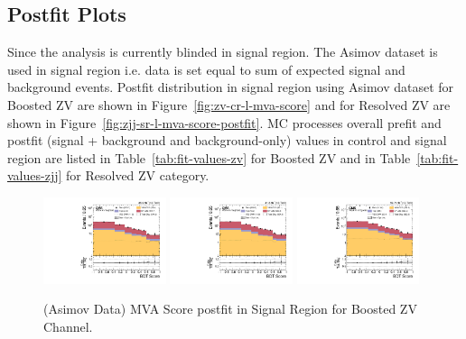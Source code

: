 \clearpage
\subsection{
  Postfit Plots
}

Since the analysis is currently blinded in signal region. The Asimov
dataset is used in signal region i.e.
data is set equal to sum of expected signal and background events.
Postfit distribution in signal region using Asimov dataset
for Boosted ZV are shown in Figure~\ref{fig:zv-cr-l-mva-score}
and for Resolved ZV are shown in Figure~\ref{fig:zjj-sr-l-mva-score-postfit}.
\gls{MC} processes overall prefit and postfit (signal + background and background-only)
values in control and signal region are listed in Table~\ref{tab:fit-values-zv}
for Boosted ZV and in Table~\ref{tab:fit-values-zjj} for Resolved ZV category.

\begin{figure}[!ht]
  \centering
  \includegraphics[width=0.32\textwidth]{analysis_plots/2016_zv.sr_l_postfit/sr_l_postfit/mva_score_zv_var2_log.pdf}
  \includegraphics[width=0.32\textwidth]{analysis_plots/2017_zv.sr_l_postfit/sr_l_postfit/mva_score_zv_var2_log.pdf}
  \includegraphics[width=0.32\textwidth]{analysis_plots/2018_zv.sr_l_postfit/sr_l_postfit/mva_score_zv_var2_log.pdf} \\
  \caption[MVA Score postfit in Signal Region for Boosted ZV Channel]%
  {(Asimov Data) MVA Score postfit in Signal Region for Boosted ZV Channel.}%
  \label{fig:zv-sr-l-mva-score-postfit}
\end{figure}

